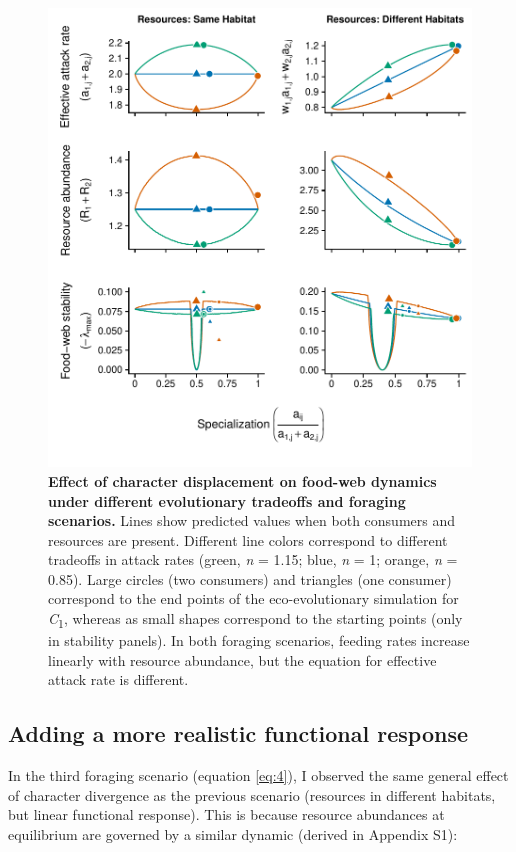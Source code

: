 \documentclass[11pt,]{article}
\begin{document}
\begin{figure}
\centering
\includegraphics{Figure_3.pdf}
\caption{\label{fig:plot_fig3}\textbf{Effect of character displacement
on food-web dynamics under different evolutionary tradeoffs and foraging
scenarios.} Lines show predicted values when both consumers and
resources are present. Different line colors correspond to different
tradeoffs in attack rates (green, \emph{n} = 1.15; blue, \emph{n} = 1;
orange, \emph{n} = 0.85). Large circles (two consumers) and triangles
(one consumer) correspond to the end points of the eco-evolutionary
simulation for \emph{C}\textsubscript{1}, whereas as small shapes
correspond to the starting points (only in stability panels). In both
foraging scenarios, feeding rates increase linearly with resource
abundance, but the equation for effective attack rate is different.}
\end{figure}

\subsection{Adding a more realistic functional
response}\label{adding-a-more-realistic-functional-response}

In the third foraging scenario (equation \ref{eq:4}), I observed the
same general effect of character divergence as the previous scenario
(resources in different habitats, but linear functional response). This
is because resource abundances at equilibrium are governed by a similar
dynamic (derived in Appendix S1):
\end{document}
